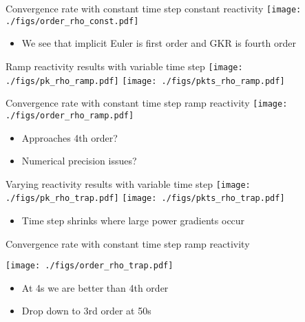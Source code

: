 \documentclass[serif]{beamer}
\begin{document}
\begin{frame}{Convergence rate with constant time step constant reactivity}
  \centering\texttt{[image: ./figs/order\_rho\_const.pdf]}
  \vfill
  \begin{itemize}
   \item We see that implicit Euler is first order and GKR is fourth order
  \end{itemize}
\end{frame}

\begin{frame}{Ramp reactivity results with variable time step}
  \vfill
  \texttt{[image: ./figs/pk\_rho\_ramp.pdf]}
  \texttt{[image: ./figs/pkts\_rho\_ramp.pdf]}
  \vfill
\end{frame}

\begin{frame}{Convergence rate with constant time step ramp reactivity}
  \centering\texttt{[image: ./figs/order\_rho\_ramp.pdf]}
  \vfill
  \begin{itemize}
   \item Approaches 4th order?
   \item Numerical precision issues?  
   \end{itemize}
\end{frame}

\begin{frame}{Varying reactivity results with variable time step}
  \texttt{[image: ./figs/pk\_rho\_trap.pdf]}
  \texttt{[image: ./figs/pkts\_rho\_trap.pdf]}
  \vfill
  \begin{itemize}
   \item Time step shrinks where large power gradients occur
  \end{itemize}
\end{frame}

\begin{frame}{Convergence rate with constant time step ramp reactivity}
  \begin{center}
  \texttt{[image: ./figs/order\_rho\_trap.pdf]}
  \end{center}
    \begin{itemize}
   \item At 4s we are better than 4th order
   \item Drop down to 3rd order at 50s
   \end{itemize}
\end{frame}
\end{document}
